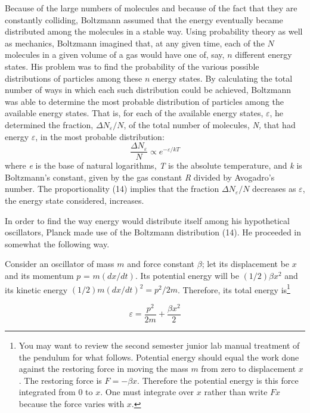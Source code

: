Because of the large numbers of molecules and because of the fact that
they are constantly colliding, Boltzmann assumed that the energy
eventually became distributed among the molecules in a stable way. Using
probability theory as well as mechanics, Boltzmann imagined that, at any
given time, each of the $N$ molecules in a given volume of a gas would
have one of, say, $n$ different energy states. His problem was to
find the probability of the various possible distributions of particles
among these $n$ energy states. By calculating the total number of
ways in which each such distribution could be achieved, Boltzmann was
able to determine the most probable distribution of particles among the
available energy states. That is, for each of the available energy
states, $\varepsilon$, he determined the fraction,
$\Delta N_{\varepsilon}/N$, of the total number of molecules,
\emph{N,} that had energy $\varepsilon$, in the most probable distribution:
%
\begin{equation}
\frac{\Delta N_{\varepsilon}}{N} \propto e^{-{\varepsilon}/kT} %
\end{equation}
%
where \emph{e} is the base of natural logarithms, \emph{T} is the
absolute temperature, and \emph{k} is Boltzmann's constant, given by the
gas constant \emph{R} divided by Avogadro's number. The proportionality
(14) implies that the fraction $\Delta N_{\varepsilon}/N$
decreases as $\varepsilon$, the energy state considered, increases.

In order to find the way energy would distribute itself among his
hypothetical oscillators, Planck made use of the Boltzmann distribution
(14). He proceeded in somewhat the following way.

Consider an oscillator of mass $m$ and force constant $\beta$; let
its displacement be $x$ and its momentum $p$ =
$m(dx/dt)$. Its potential energy will be
$(1/2)\beta x^2$ and its kinetic energy $(1/2)m(dx/dt)^{2} = p^{2}/2m$.
Therefore, its total energy is\footnote{You may want to review the
  second semester junior lab manual treatment of the pendulum for what
  follows. Potential energy should equal the work done against the
  restoring force in moving the mass $m$ from zero to displacement
  $x$. The restoring force is $F = - \beta x$. Therefore the
  potential energy is this force integrated from 0 to $x$. One must
  integrate over $x$ rather than write $Fx$ because the force
  varies with $x$.}

\begin{equation}
\varepsilon = \frac{p^2}{2m} + \frac{\beta x^2}{2} %
\end{equation}

